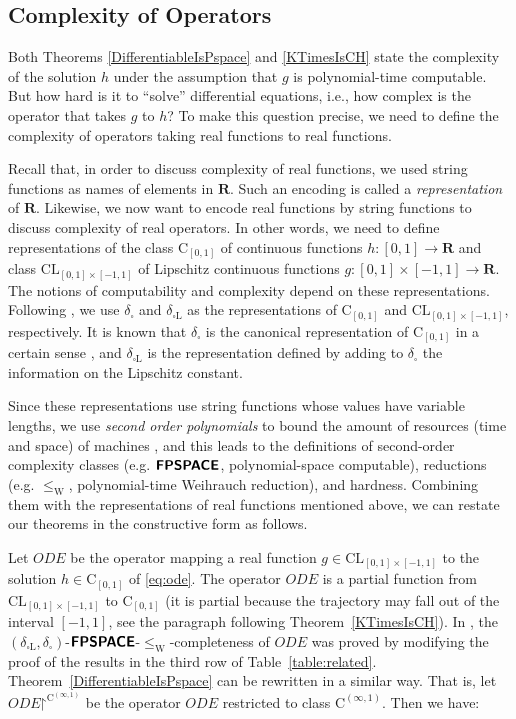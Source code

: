 \documentclass[12pt,a4paper]{article}
\theoremstyle{definition}
\theoremstyle{remark}
\newcommand{\R}{\mathbf R}
\newcommand{\OpIVP}{\mathit{ODE}}
\newcommand{\deltabox}{\delta _\square}
\newcommand{\deltaboxLip}{\delta _{\square \mathrm L}}
\newcommand{\classtwofont}[1]{\text{\bfseries \sffamily \upshape #1}}
\newcommand{\classFPSPACEtwo}{\classtwofont{FPSPACE}}
\newcommand{\redW}{\leq _{\mathrm W}}
\newcommand{\classLip}{\mathrm{CL}}
\newcommand{\classC}{\mathrm C}
\begin{document}
\subsection{Complexity of Operators}
\label{section: constructive}

Both Theorems \ref{DifferentiableIsPspace} and \ref{KTimesIsCH}
state the complexity of the solution $h$ under the assumption 
that $g$ is polynomial-time computable.
But how hard is it to ``solve'' differential equations,
i.e., how complex is the operator that takes $g$ to $h$? 
To make this question precise,
we need to define the complexity of operators 
taking real functions to real functions.

Recall that, in order to discuss complexity of real functions,
we used string functions as names of elements in $\R$. 
Such an encoding is called a \emph{representation} of $\R$.
Likewise, 
we now want to encode real functions by string functions
to discuss complexity of real operators. 
In other words, we need to define representations of
the class $\classC _{[0, 1]}$ of continuous functions $h \colon [0,1] \to \R$ 
and class $\classLip _{[0, 1] \times [-1, 1]}$ of Lipschitz continuous functions $g \colon [0, 1] \times [-1, 1] \to \R$. 
The notions of computability and complexity depend on these representations.
Following \cite{kawamura2010operators},
we use $\deltabox$ and $\deltaboxLip$ as the 
representations of $\classC_{[0,1]}$ and $\classLip_{[0, 1] \times [-1, 1]}$, 
respectively.
It is known that 
$\deltabox$ is the canonical representation of $\classC_{[0, 1]}$ 
in a certain sense \cite{kawamura11:_funct_space_repres_and_polyn_time_comput}, 
and $\deltaboxLip$ is the representation defined by adding to $\deltabox$
the information on the Lipschitz constant.

Since these representations use string functions 
whose values have variable lengths,
we use \emph{second order polynomials}
to bound the amount of resources (time and space) of machines
\cite{kawamura2010operators}, 
and this leads to the definitions of second-order complexity classes
(e.g. $\classFPSPACEtwo$, polynomial-space computable),
reductions (e.g. $\redW$, polynomial-time Weihrauch reduction), 
and hardness.
Combining them with the representations of real functions mentioned above,
we can restate our theorems in the constructive form as follows.

Let $\OpIVP$ be the operator 
mapping a real function $g \in \classLip_{[0, 1] \times [-1, 1]}$ to
the solution $h \in \classC_{[0, 1]}$ of \eqref{eq:ode}.
The operator $\OpIVP$ is a partial function 
from $\classLip _{[0, 1] \times [-1, 1]}$ to $\classC _{[0, 1]}$
(it is partial because the trajectory may fall out of the interval $[-1, 1]$, 
see the paragraph following Theorem~\ref{KTimesIsCH}).
In \cite[Theorem 4.9]{kawamura2010operators}, the
$(\deltaboxLip, \deltabox)$-$\classFPSPACEtwo$-$\redW$-completeness of $\OpIVP$ 
was proved
by modifying
the proof of the results in the third row of Table~\ref{table:related}.
Theorem~\ref{DifferentiableIsPspace} can be rewritten in a similar way. 
That is, let $\OpIVP \mathord\upharpoonright ^{\classC ^{(\infty, 1)}}$ be the operator $\OpIVP$ 
restricted to class $\classC^{(\infty, 1)}$. Then we have: 
\end{document}
